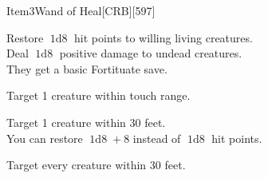 

\begin{card}{Item}{3}{Wand of Heal}[CRB][597]



Restore \(\operatorname{1d8}\) hit points to willing living creatures.\\
Deal \(\operatorname{1d8}\) positive damage to undead creatures.\\
They get a basic Fortituate save.


Target 1 creature within touch range.


Target 1 creature within 30 feet.\\
You can restore \(\operatorname{1d8}+8\) instead of \(\operatorname{1d8}\) hit points.



Target every creature within 30 feet.
\end{card}
